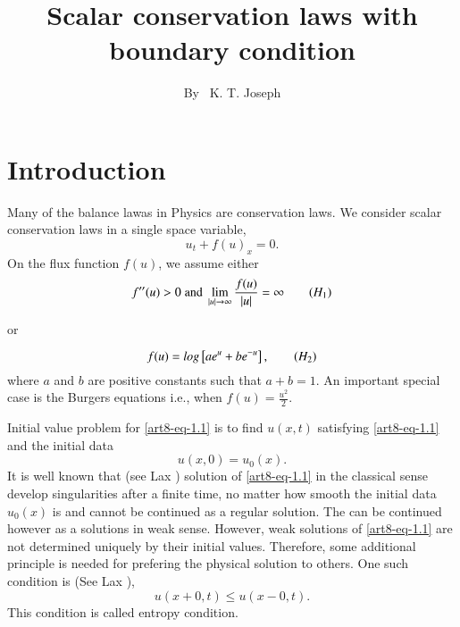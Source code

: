 \title{Scalar conservation laws with boundary condition}

\author{By~ K. T. Joseph}

\date{}
\maketitle

\section{Introduction}\label{art8-sec-1}

Many of the balance lawas in Physics are conservation laws. We consider scalar conservation laws in a single space variable,
\begin{equation}\label{art8-eq-1.1}
u_{t}+f(u)_{x} = 0.
\end{equation}
On the flux function $f(u)$, we assume either
\begin{equation}\label{art8-eq-H1}
f''(u)> 0 \;\text{and}\; \lim\limits_{|u|\rightarrow \infty}\dfrac{f(u)}{|u|}= \infty\tag{$H_{1}$}
\end{equation}

\begin{center}
or
\end{center}
\begin{equation}\label{art8-eq-H2}
f(u) = log\left[ae^{u} + be^{-u}\right],\tag{$H_{2}$}
\end{equation}
where $a$ and $b$ are positive constants such that $a+b=1$. An important special case is the Burgers equations i.e., when $f(u) = \frac{u^{2}}{2}$.

Initial value problem for \eqref{art8-eq-1.1} is to find $u(x, t)$ satisfying  \eqref{art8-eq-1.1} and the initial data
\begin{equation}\label{art8-eq-1.2}
u(x, 0) = u_{0}(x).
\end{equation}
It is well known that (see Lax \cite{art8-key8}) solution of \eqref{art8-eq-1.1} in the classical sense develop singularities after a finite time, no matter how smooth the initial data $u_{0}(x)$ is and cannot be continued as a regular solution. The can be continued however as a solutions in weak sense. However, weak solutions of \eqref{art8-eq-1.1} are not determined uniquely by their initial values. Therefore, some additional principle is needed for prefering the physical solution to others. One such condition is (See Lax \cite{art8-key9}),
\begin{equation}\label{art8-eq-1.3}
u(x+0, t)\leq u(x-0,t).
\end{equation}
This condition is called entropy condition.

